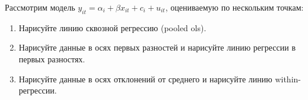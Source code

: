 \begin{problem}
Рассмотрим модель $y_{it} = \alpha_i + \beta x_{it} + c_i + u_{it}$, оцениваемую по нескольким точкам:



    \begin{enumerate}
\item Нарисуйте линию сквозной регрессию (pooled ols).
\item Нарисуйте данные в осях первых разностей и нарисуйте линию регрессии в первых разностях.
\item Нарисуйте данные в осях отклонений от среднего и нарисуйте линию within-регрессии.
    \end{enumerate}
\begin{sol}
\end{sol}
\end{problem}






\renewenvironment{solution}[1]{%
         \vskip .5cm plus 2cm minus 0.1cm%
         {\bfseries \hyperlink{problem:#1}{#1.}}%
}%
{%
}%

\section{}



\section{}
\printbibliography[heading=none]    

